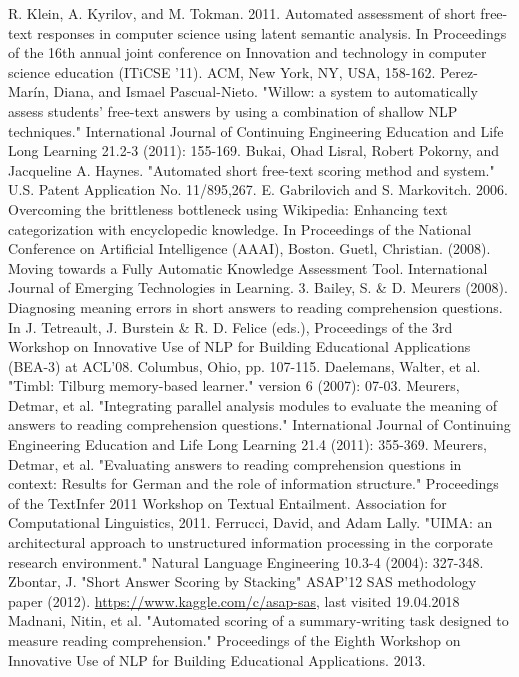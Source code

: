 \documentclass[rnd]{mas_report}
\begin{document}
\begin{thebibliography}{3}
 R. Klein, A. Kyrilov, and M. Tokman. 2011. Automated assessment of short free-text responses in computer science using latent semantic analysis. In Proceedings of the 16th annual joint conference on Innovation and technology in computer science education (ITiCSE '11). ACM, New York, NY, USA, 158-162.
 Perez-Marín, Diana, and Ismael Pascual-Nieto. "Willow: a system to automatically assess students’ free-text answers by using a combination of shallow NLP techniques." International Journal of Continuing Engineering Education and Life Long Learning 21.2-3 (2011): 155-169.
 Bukai, Ohad Lisral, Robert Pokorny, and Jacqueline A. Haynes. "Automated short free-text scoring method and system." U.S. Patent Application No. 11/895,267.
 E. Gabrilovich and S. Markovitch. 2006. Overcoming the brittleness bottleneck using Wikipedia: Enhancing text categorization with encyclopedic knowledge. In Proceedings of the National Conference on Artificial Intelligence (AAAI), Boston.
 Guetl, Christian. (2008). Moving towards a Fully Automatic Knowledge Assessment Tool. International Journal of Emerging Technologies in Learning. 3. 
 Bailey, S. \& D. Meurers (2008). Diagnosing meaning errors in short answers to reading comprehension questions. In J. Tetreault, J. Burstein \& R. D. Felice (eds.), Proceedings of the 3rd Workshop on Innovative Use of NLP for Building Educational Applications (BEA-3) at ACL'08. Columbus, Ohio, pp. 107-115.
 Daelemans, Walter, et al. "Timbl: Tilburg memory-based learner." version 6 (2007): 07-03.
 Meurers, Detmar, et al. "Integrating parallel analysis modules to evaluate the meaning of answers to reading comprehension questions." International Journal of Continuing Engineering Education and Life Long Learning 21.4 (2011): 355-369.
 Meurers, Detmar, et al. "Evaluating answers to reading comprehension questions in context: Results for German and the role of information structure." Proceedings of the TextInfer 2011 Workshop on Textual Entailment. Association for Computational Linguistics, 2011.
 Ferrucci, David, and Adam Lally. "UIMA: an architectural approach to unstructured information processing in the corporate research environment." Natural Language Engineering 10.3-4 (2004): 327-348.
 Zbontar, J. "Short Answer Scoring by Stacking" ASAP'12 SAS methodology paper (2012).
 \url{https://www.kaggle.com/c/asap-sas}, last visited 19.04.2018
 Madnani, Nitin, et al. "Automated scoring of a summary-writing task designed to measure reading comprehension." Proceedings of the Eighth Workshop on Innovative Use of NLP for Building Educational Applications. 2013.

\end{thebibliography}
\end{document}
